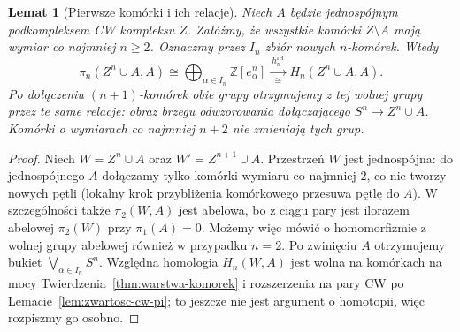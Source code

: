\documentclass[11pt,a4paper,oneside]{report}
\newcommand{\Z}{\mathbb{Z}}
\theoremstyle{plain}
\newtheorem{lemat}[twierdzenie]{Lemat}
\theoremstyle{definition}
\theoremstyle{remark}
\begin{document}
\begin{lemat}[Pierwsze komórki i ich relacje]
\label{lem:pierwsze-komorki-pi}
Niech $A$ będzie jednospójnym
podkompleksem CW kompleksu $Z$.
Załóżmy, że wszystkie komórki
$Z\setminus A$ mają wymiar
co najmniej $n\geq2$.
Oznaczmy przez $I_n$
zbiór nowych $n$-komórek.
Wtedy
\[
 \pi_n(Z^n\cup A,A)
 \cong\bigoplus_{\alpha\in I_n}\Z[e_\alpha^n]
 \xrightarrow[\cong]{\ h_n^{\mathrm{rel}}\ }
 H_n(Z^n\cup A,A).
\]
Po dołączeniu $(n+1)$-komórek
obie grupy otrzymujemy
z tej wolnej grupy przez
te \emph{same} relacje:
obraz brzegu odwzorowania
dołączającego $S^n\to
Z^n\cup A$. Komórki
o wymiarach co najmniej
$n+2$ nie zmieniają
tych grup.
\end{lemat}
\begin{proof}
Niech $W=Z^n\cup A$ oraz $W'=Z^{n+1}\cup A$.
Przestrzeń $W$ jest jednospójna: do jednospójnego $A$
dołączamy tylko komórki wymiaru co najmniej $2$, co nie tworzy
nowych pętli (lokalny krok przybliżenia komórkowego przesuwa pętlę do $A$).
W szczególności także $\pi_2(W,A)$ jest abelowa, bo z ciągu pary
jest ilorazem abelowej $\pi_2(W)$ przy $\pi_1(A)=0$.
Możemy więc mówić o homomorfizmie z wolnej grupy abelowej
również w przypadku $n=2$.
Po zwinięciu $A$
otrzymujemy bukiet
$\bigvee_{\alpha\in I_n}S^n$.
Względna homologia
$H_n(W,A)$ jest
wolna na komórkach
na mocy
Twierdzenia~\ref{thm:warstwa-komorek}
i rozszerzenia na pary CW po Lemacie~\ref{lem:zwartosc-cw-pi};
to jeszcze nie jest
argument o homotopii,
więc rozpiszmy go
osobno.


\end{proof}
\end{document}
